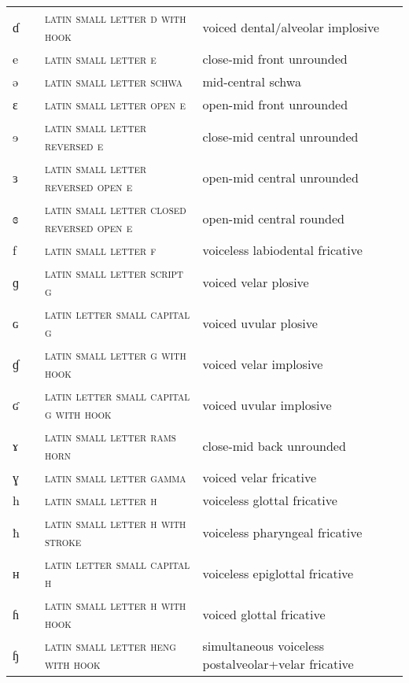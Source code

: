 \begin{center}
\begin{xtabular}{ l L{1.2cm} L{5.4cm} L{4.2cm} }
ɗ &  & \textsc{latin small letter d with hook} & voiced dental/alveolar implosive \\ 
e &  & \textsc{latin small letter e} & close-mid front unrounded \\ 
ə &  & \textsc{latin small letter schwa} & mid-central schwa \\ 
ɛ &  & \textsc{latin small letter open e} & open-mid front unrounded \\ 
ɘ &  & \textsc{latin small letter reversed e} & close-mid central unrounded \\ 
ɜ &  & \textsc{latin small letter reversed open e} & open-mid central unrounded \\ 
ɞ &  & \textsc{latin small letter closed reversed open e} & open-mid central rounded \\ 
f &  & \textsc{latin small letter f} & voiceless labiodental fricative \\ 
ɡ &  & \textsc{latin small letter script g} & voiced velar plosive \\ 
ɢ &  & \textsc{latin letter small capital g} & voiced uvular plosive \\ 
ɠ &  & \textsc{latin small letter g with hook} & voiced velar implosive \\ 
ʛ &  & \textsc{latin letter small capital g with hook} & voiced uvular implosive \\ 
ɤ &  & \textsc{latin small letter rams horn} & close-mid back unrounded \\ 
ɣ &  & \textsc{latin small letter gamma} & voiced velar fricative \\ 
h &  & \textsc{latin small letter h} & voiceless glottal fricative \\ 
ħ &  & \textsc{latin small letter h with stroke} & voiceless pharyngeal fricative \\ 
ʜ &  & \textsc{latin letter small capital h} & voiceless epiglottal fricative \\ 
ɦ &  & \textsc{latin small letter h with hook} & voiced glottal fricative \\ 
ɧ &  & \textsc{latin small letter heng with hook} & simultaneous voiceless postalveolar+velar fricative \\ 

\end{xtabular}
\end{center}
